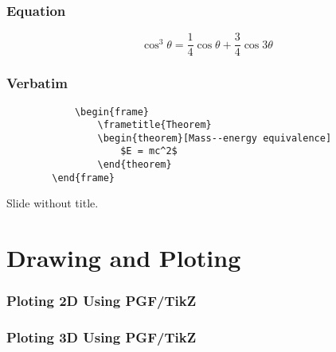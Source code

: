 \documentclass[
	9pt, %
	fontset=none,
]{beamer}
\begin{document}

\begin{frame}
	\frametitle{Equation}

	\begin{equation}
		\cos^3 \theta =\frac{1}{4}\cos\theta+\frac{3}{4}\cos 3\theta
	\end{equation}
\end{frame}


\begin{frame}[fragile] %
	\frametitle{Verbatim}
	
	\begin{example}
		\begin{verbatim}
			\begin{frame}
				\frametitle{Theorem}
				\begin{theorem}[Mass--energy equivalence]
					$E = mc^2$
				\end{theorem}
		\end{frame}\end{verbatim} %
	\end{example}
\end{frame}


\begin{frame}
	Slide without title.
\end{frame}


\section{Drawing and Ploting}
\begin{frame}
	\frametitle{Ploting 2D Using PGF/TikZ}
\end{frame}

\begin{frame}
	\frametitle{Ploting 3D Using PGF/TikZ}
\end{frame}
\end{document}
